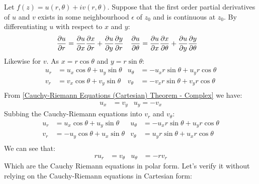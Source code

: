 \documentclass[12pt, english]{book}
\makeatletter
\renewenvironment{proof}[1][\proofname]{\par
	\pushQED{\qed}%
	\normalfont \topsep6\p@\@plus6\p@\relax
	\list{}{%
		\settowidth{\leftmargin}{\itshape\proofname:\hskip\labelsep}%
		\setlength{\labelwidth}{0pt}%
		\setlength{\itemindent}{-\leftmargin}%
	}%
	\item[\hskip\labelsep\itshape#1\@addpunct{:}]\ignorespaces
	}{ \popQED\endlist\@endpefalse}
\makeatother
\begin{document}
	\begin{proof}
		Let \(f(z) = u(r,\theta) + iv(r,\theta)\). Suppose that the first order partial derivatives of \(u\) and \(v\) exists in some neighbourhood \(\epsilon \) of \(z_0\) and is continuous at \(z_0\). By differentiating \(u\) with respect to \(x\) and \(y\):
		\begin{align*}
			\pdv{u}{r} &= \pdv{u}{x} \pdv{x}{r} + \pdv{u}{y}\pdv{y}{r} &
			\pdv{u}{\theta} &= \pdv{u}{x} \pdv{x}{\theta} + \pdv{u}{y}\pdv{y}{\theta} 
		\end{align*}
		Likewise for \(v\). As \(x = r \cos\theta \) and \(y = r\sin \theta\):
		\begin{align*}
			u_r &= u_x \cos \theta + u_y \sin \theta 
				&	u_\theta &= -u_x r \sin \theta + u_y r \cos \theta \\
			v_r &= v_x \cos \theta + v_y \sin \theta 
			&	v_\theta &= -v_x r \sin \theta + v_y r \cos \theta \\
		\end{align*}
		From \cref{Cauchy-Riemann Equations (Cartesian) Theorem - Complex} we have: 
		\begin{align*}
			u_x &= v_y	&	u_y = -v_x
		\end{align*}
		Subbing the Cauchy-Riemann equations into \(v_r\) and \(v_\theta\):
		\begin{align*}
			u_r &= u_x \cos \theta + u_y \sin \theta 
			&	u_\theta &= -u_x r \sin \theta + u_y r \cos \theta \\
			v_r &= -u_y \cos \theta + u_x \sin \theta 
			&	v_\theta &= u_y r \sin \theta + u_x r \cos \theta \\
		\end{align*}
		We can see that: 
		\begin{align*}
			ru_r &= v_\theta 	&	u_\theta &= -rv_r
		\end{align*}
		Which are the Cauchy Riemann equations in polar form. Let's verify it without relying on the Cauchy-Riemann equations in Cartesian form: 
		

\end{proof}
\end{document}
